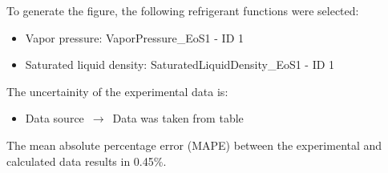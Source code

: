 To generate the figure, the following refrigerant functions were selected:
\begin{itemize}
\item Vapor pressure: VaporPressure\_EoS1 - ID 1
\item Saturated liquid density: SaturatedLiquidDensity\_EoS1 - ID 1
\end{itemize}

The uncertainity of the experimental data is:
\begin{itemize}
\item Data source $\,\to\,$ Data was taken from table
\end{itemize}

The mean absolute percentage error (MAPE) between the experimental and calculated data results in 0.45\%.
\FloatBarrier
\newpage
